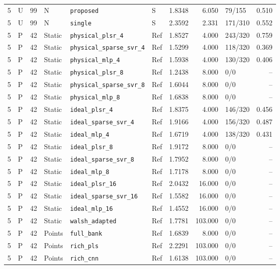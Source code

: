 \documentclass[10pt,a4paper]{article}
\begin{document}
\begin{longtable}{rlrlllrrlr}
5 & U & 99 & N & \texttt{proposed} & S & 1.8348 & 6.050 & 79/155 & 0.510 \\
5 & U & 99 & N & \texttt{single} & S & 2.3592 & 2.331 & 171/310 & 0.552 \\
5 & P & 42 & Static & \texttt{physical\_plsr\_4} & Ref & 1.8527 & 4.000 & 243/320 & 0.759 \\
5 & P & 42 & Static & \texttt{physical\_sparse\_svr\_4} & Ref & 1.5299 & 4.000 & 118/320 & 0.369 \\
5 & P & 42 & Static & \texttt{physical\_mlp\_4} & Ref & 1.5938 & 4.000 & 130/320 & 0.406 \\
5 & P & 42 & Static & \texttt{physical\_plsr\_8} & Ref & 1.2438 & 8.000 & 0/0 & -- \\
5 & P & 42 & Static & \texttt{physical\_sparse\_svr\_8} & Ref & 1.6044 & 8.000 & 0/0 & -- \\
5 & P & 42 & Static & \texttt{physical\_mlp\_8} & Ref & 1.6838 & 8.000 & 0/0 & -- \\
5 & P & 42 & Static & \texttt{ideal\_plsr\_4} & Ref & 1.8375 & 4.000 & 146/320 & 0.456 \\
5 & P & 42 & Static & \texttt{ideal\_sparse\_svr\_4} & Ref & 1.9166 & 4.000 & 156/320 & 0.487 \\
5 & P & 42 & Static & \texttt{ideal\_mlp\_4} & Ref & 1.6719 & 4.000 & 138/320 & 0.431 \\
5 & P & 42 & Static & \texttt{ideal\_plsr\_8} & Ref & 1.9172 & 8.000 & 0/0 & -- \\
5 & P & 42 & Static & \texttt{ideal\_sparse\_svr\_8} & Ref & 1.7952 & 8.000 & 0/0 & -- \\
5 & P & 42 & Static & \texttt{ideal\_mlp\_8} & Ref & 1.7178 & 8.000 & 0/0 & -- \\
5 & P & 42 & Static & \texttt{ideal\_plsr\_16} & Ref & 2.0432 & 16.000 & 0/0 & -- \\
5 & P & 42 & Static & \texttt{ideal\_sparse\_svr\_16} & Ref & 1.5582 & 16.000 & 0/0 & -- \\
5 & P & 42 & Static & \texttt{ideal\_mlp\_16} & Ref & 1.4552 & 16.000 & 0/0 & -- \\
5 & P & 42 & Static & \texttt{walsh\_adapted} & Ref & 1.7781 & 103.000 & 0/0 & -- \\
5 & P & 42 & Points & \texttt{full\_bank} & Ref & 1.6839 & 8.000 & 0/0 & -- \\
5 & P & 42 & Points & \texttt{rich\_pls} & Ref & 2.2291 & 103.000 & 0/0 & -- \\
5 & P & 42 & Points & \texttt{rich\_cnn} & Ref & 1.6138 & 103.000 & 0/0 & -- \\

\end{longtable}
\end{document}

